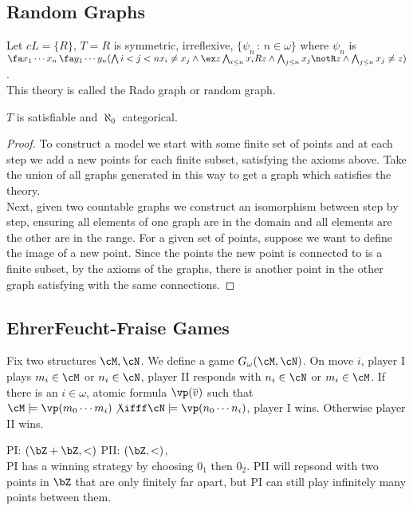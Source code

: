
\subsection{Random Graphs}

Let $cL = \{R\}$, $T = R$ is symmetric, irreflexive, $\{\psi_n \, : \, n \in \omega\}$ where $\psi_n$ is $\fa x_1 \cdots x_n \, \fa y_1 \cdots y_n(\bigwedge{i< j < n} x_i\neq x_j \wedge \ex z \bigwedge_{i \le n} x_iRz \wedge \bigwedge_{j \le n}x_j \notR z \wedge \bigwedge_{j \le n} x_j \neq z)$.  \\
This theory is called the Rado graph or random graph. 

\begin{theorem}
    $T$ is satisfiable and $\aleph_0$ categorical. 
\end{theorem}

\begin{proof}
    To construct a model we start with some finite set of points and at each step we add a new points for each finite subset, satisfying the axioms above. Take the union of all graphs generated in this way to get a graph which satisfies the theory. \\
    Next, given two countable graphs we construct an isomorphism between step by step, ensuring all elements of one graph are in the domain and all elements are the other are in the range. For a given set of points, suppose we want to define the image of a new point. Since the points the new point is connected to is a finite subset, by the axioms of the graphs, there is another point in the other graph satisfying with the same connections.    
\end{proof}

\subsection{EhrerFeucht-Fraise Games} 

Fix two structures $\cM, \cN$. We define a game $G_{\omega}(\cM, \cN)$. On move $i$, player I plays $m_i \in \cM$ or $n_i \in \cN$, player II responds with $n_i \in \cN$ or $m_i \in \cM$. If there is an $i \in \omega$, atomic formula $\vp(\overline{v})$ such that $\cM \models \vp(m_0 \cdots m_i) \not\ifff \cN \models \vp(n_0 \cdots n_i)$, player I wins. Otherwise player II wins. 

\begin{example}
    PI: $(\bZ + \bZ, < )$ PII: $(\bZ, <)$, \\
    PI has a winning strategy by choosing $0_1$ then $0_2$. PII will repsond with two points in $\bZ$ that are only finitely far apart, but PI can still play infinitely many points between them.
\end{example}

